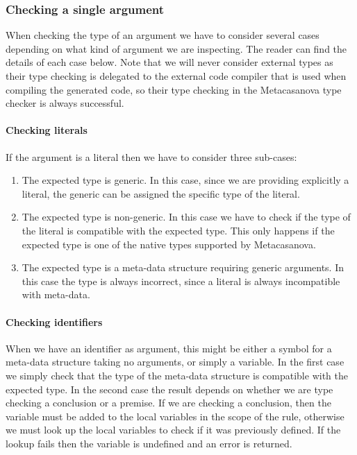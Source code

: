 \subsubsection{Checking a single argument}
\label{subsec:ch_metacasanova_argument_check}
When checking the type of an argument we have to consider several cases depending on what kind of argument we are inspecting. The reader can find the details of each case below. Note that we will never consider external types as their type checking is delegated to the external code compiler that is used when compiling the generated code, so their type checking in the Metacasanova type checker is always successful.

\paragraph{Checking literals}
If the argument is a literal then we have to consider three sub-cases:

\begin{enumerate}
	\item The expected type is generic. In this case, since we are providing explicitly a literal, the generic can be assigned the specific type of the literal.
	\item The expected type is non-generic. In this case we have to check if the type of the literal is compatible with the expected type. This only happens if the expected type is one of the native types supported by Metacasanova.
	\item The expected type is a meta-data structure requiring generic arguments. In this case the type is always incorrect, since a literal is always incompatible with meta-data.
\end{enumerate}

\paragraph{Checking identifiers}
When we have an identifier as argument, this might be either a symbol for a meta-data structure taking no arguments, or simply a variable. In the first case we simply check that the type of the meta-data structure is compatible with the expected type. In the second case the result depends on whether we are type checking a conclusion or a premise. If we are checking a conclusion, then the variable must be added to the local variables in the scope of the rule, otherwise we must look up the local variables to check if it was previously defined. If the lookup fails then the variable is undefined and an error is returned.

